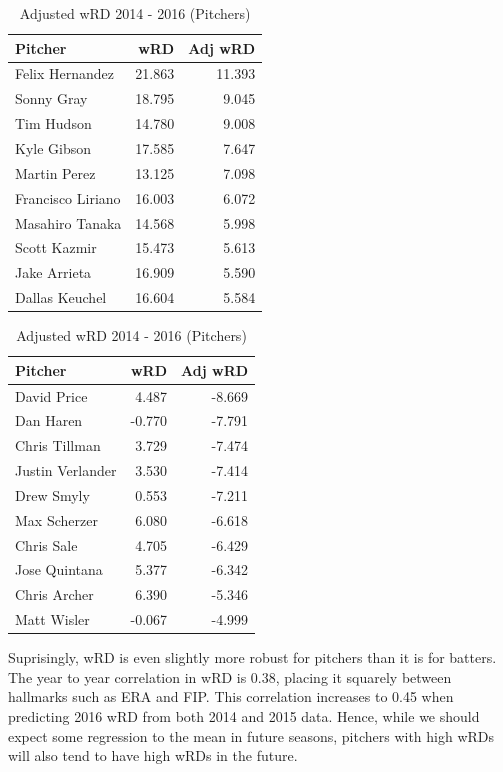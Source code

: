 \documentclass[11pt]{article}
\begin{document}
\begin{table}[ht]
\centering
\begin{tabular}{lrr}
  \hline
Pitcher & wRD & Adj wRD \\ 
  \hline
Felix Hernandez & 21.863 & 11.393 \\ 
  Sonny Gray & 18.795 & 9.045 \\ 
  Tim Hudson & 14.780 & 9.008 \\ 
  Kyle Gibson & 17.585 & 7.647 \\ 
  Martin Perez & 13.125 & 7.098 \\ 
  Francisco Liriano & 16.003 & 6.072 \\ 
  Masahiro Tanaka & 14.568 & 5.998 \\ 
  Scott Kazmir & 15.473 & 5.613 \\ 
  Jake Arrieta & 16.909 & 5.590 \\ 
  Dallas Keuchel & 16.604 & 5.584 \\ 
   \hline
\end{tabular}
\quad
\begin{tabular}{lrr}
  \hline
Pitcher & wRD & Adj wRD\\ 
  \hline
David Price & 4.487 & -8.669 \\ 
  Dan Haren & -0.770 & -7.791 \\ 
  Chris Tillman & 3.729 & -7.474 \\ 
  Justin Verlander & 3.530 & -7.414 \\ 
  Drew Smyly & 0.553 & -7.211 \\ 
  Max Scherzer & 6.080 & -6.618 \\ 
  Chris Sale & 4.705 & -6.429 \\ 
  Jose Quintana & 5.377 & -6.342 \\ 
  Chris Archer & 6.390 & -5.346 \\ 
  Matt Wisler & -0.067 & -4.999 \\ 
   \hline
\end{tabular}
\caption{Adjusted wRD 2014 - 2016 (Pitchers)}
\end{table}

Suprisingly, wRD is even slightly more robust for pitchers than it is for batters.  The year to year correlation in wRD is 0.38, placing it squarely between hallmarks such as ERA and FIP.  This correlation increases to 0.45 when predicting 2016 wRD from both 2014 and 2015 data.  Hence, while we should expect some regression to the mean in future seasons, pitchers with high wRDs will also tend to have high wRDs in the future.\\
\end{document}
